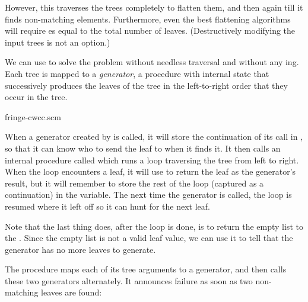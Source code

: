 \n
However, this traverses the trees completely to flatten
them, and then again till it finds non-matching
elements.  Furthermore, even the best flattening
algorithms will require es equal to the total
number of leaves.  (Destructively modifying the input
trees is not an option.)

We can use  to solve the problem without
needless traversal and without any ing.  Each
tree is mapped to a {\em generator}, a procedure with
internal state that successively produces the leaves of
the tree in the left-to-right order that they occur in
the tree.

\scmfilename fringe-cwcc.scm


\n
When a generator created by  is
called, it will store the continuation of its call in
, so that it can know who to send the leaf to
when it finds it.  It then calls an internal procedure
called  which runs a loop traversing
the tree from left to right.  When the loop encounters
a leaf, it will use  to return the leaf as
the generator’s result, but it will remember to store
the rest of the loop (captured as a 
continuation) in the  variable.  The
next time the generator is called, the loop is resumed
where it left off so it can hunt for the next leaf.

Note that the last thing  does,
after the loop is done, is to return the empty list to
the
.  Since the empty list is not a valid leaf
value, we can use it to tell that the generator has
no more leaves to generate.

The procedure  maps each of its tree
arguments to a generator, and then calls these two
generators alternately.  It announces failure as soon
as two non-matching leaves are found:

